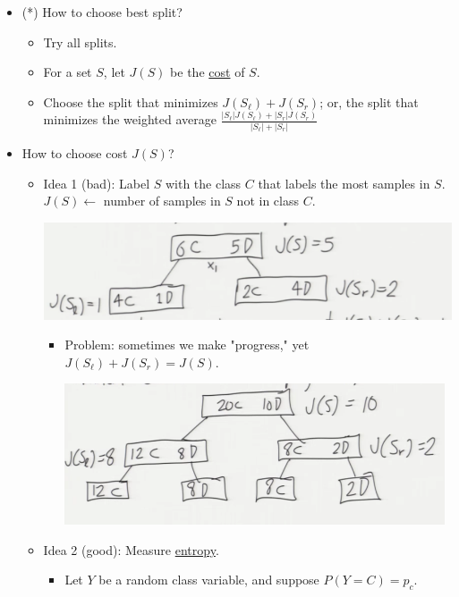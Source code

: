 \documentclass[10pt]{article}
\begin{document}
	\begin{itemize}
		\item (*) How to choose best split?
			\begin{itemize}
				\item Try all splits.
				\item For a set $S$, let $J(S)$ be the \underline{cost} of $S$.
				\item Choose the split that minimizes $J(S_{\ell}) + J(S_{r})$; or, the split that minimizes the weighted average $\frac{|S_{\ell}|J(S_{\ell})+ |S_{r}|J(S_{r})}{|S_{\ell}| + |S_{r}|}$
			\end{itemize}
		\item How to choose cost $J(S)$?
			\begin{itemize}
				\item Idea 1 (bad): Label $S$ with the class $C$ that labels the most samples in $S$. $J(S) \leftarrow$ number of samples in $S$ not in class $C$.
				\begin{center}
					\includegraphics[scale=0.6]{../images/idea1good}
				\end{center}
				\begin{itemize}
					\item Problem: sometimes we make "progress," yet $J(S_{\ell}) + J(S_{r}) = J(S)$.
				\begin{center}
					\includegraphics[scale=0.6]{../images/idea1bad}
				\end{center}
				\end{itemize}
				\item Idea 2 (good): Measure \underline{entropy}.
				\begin{itemize}
					\item Let $Y$ be a random class variable, and suppose $P(Y=C) = p_{c}$.

\end{itemize}
\end{itemize}
\end{itemize}
\end{document}
